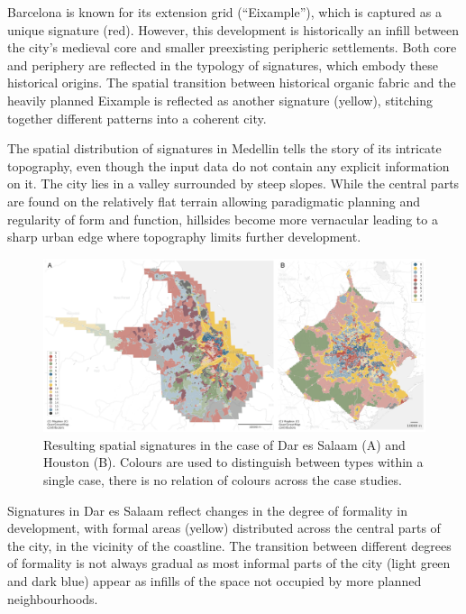 Barcelona is known for its extension grid (``Eixample''), which is captured as
a unique signature (red).
However, this development is historically an infill between the city's medieval core and
smaller preexisting peripheric settlements. Both core and periphery are
reflected in the typology of signatures, which embody these historical
origins. The spatial transition between historical organic fabric and the
heavily planned
Eixample is reflected as another signature (yellow), stitching together different patterns into a coherent city.

The spatial distribution of signatures in Medellin tells the story of its intricate
topography, even though the input data do not contain any explicit information
on it. The
city lies in a valley surrounded by steep slopes. While the central parts are
found on the
relatively flat terrain allowing paradigmatic planning and regularity of form
and function, hillsides become more vernacular leading to a sharp urban edge where
topography limits further development.

\begin{figure}
    \includegraphics[width=\linewidth]{figures/maps2.png}
    \caption{Resulting spatial signatures in the case of Dar es Salaam (A) and Houston (B).
    Colours are used to distinguish between types within a single case, there is no relation of colours across the case studies.}
    \label{fig:maps2}
\end{figure}

Signatures in Dar es Salaam reflect changes in the degree of formality in development, with
formal areas (yellow) distributed across the central parts of the city, in the vicinity
of the
coastline. The transition between different degrees of formality is not always gradual
as most informal parts of the city (light green and dark blue) appear as
infills of the space not occupied by more planned neighbourhoods.

